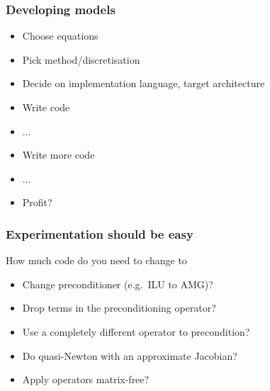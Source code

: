\documentclass[presentation]{beamer}
\begin{document}
\begin{frame}
  \frametitle{Developing models}

  \begin{itemize}
  \item Choose equations
  \item Pick method/discretisation
  \item Decide on implementation language, target architecture
  \item Write code
  \item ...
  \item Write more code
  \item ...
  \item Profit?
  \end{itemize}
\end{frame}

\begin{frame}
  \frametitle{Experimentation should be easy}
  How much code do you need to change to
  \begin{itemize}
  \item Change preconditioner (e.g.~ILU to AMG)?
  \item Drop terms in the preconditioning operator?
  \item Use a completely different operator to precondition?
  \item Do quasi-Newton with an approximate Jacobian?
  \item Apply operators matrix-free?
  \end{itemize}
\end{frame}


\begin{frame}[standout]
\end{frame}
\end{document}
